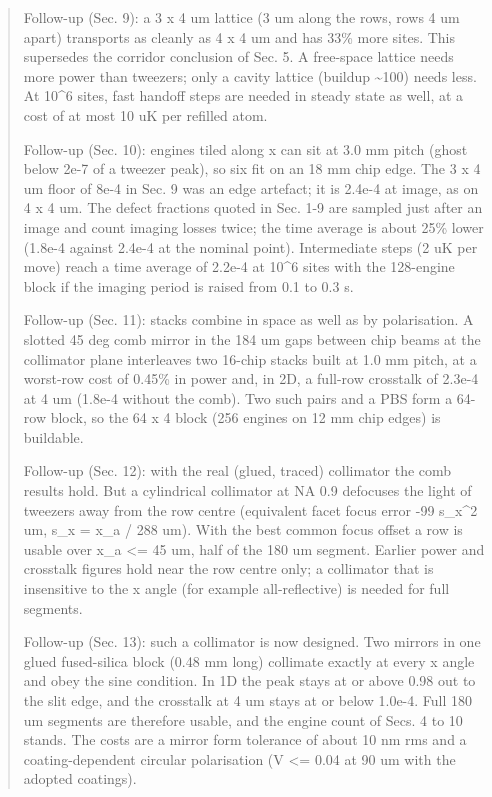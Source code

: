 \begin{quote}
Follow-up (Sec. 9): a 3 x 4 um lattice (3 um along the rows, rows 4 um
apart) transports as cleanly as 4 x 4 um and has 33\% more sites. This
supersedes the corridor conclusion of Sec. 5. A free-space lattice needs
more power than tweezers; only a cavity lattice (buildup
\textasciitilde100) needs less. At 10\^{}6 sites, fast handoff steps are
needed in steady state as well, at a cost of at most 10 uK per refilled
atom.

Follow-up (Sec. 10): engines tiled along x can sit at 3.0 mm pitch
(ghost below 2e-7 of a tweezer peak), so six fit on an 18 mm chip edge.
The 3 x 4 um floor of 8e-4 in Sec. 9 was an edge artefact; it is 2.4e-4
at image, as on 4 x 4 um. The defect fractions quoted in Sec. 1-9 are
sampled just after an image and count imaging losses twice; the time
average is about 25\% lower (1.8e-4 against 2.4e-4 at the nominal
point). Intermediate steps (2 uK per move) reach a time average of
2.2e-4 at 10\^{}6 sites with the 128-engine block if the imaging period
is raised from 0.1 to 0.3 s.

Follow-up (Sec. 11): stacks combine in space as well as by polarisation.
A slotted 45 deg comb mirror in the 184 um gaps between chip beams at
the collimator plane interleaves two 16-chip stacks built at 1.0 mm
pitch, at a worst-row cost of 0.45\% in power and, in 2D, a full-row
crosstalk of 2.3e-4 at 4 um (1.8e-4 without the comb). Two such pairs
and a PBS form a 64-row block, so the 64 x 4 block (256 engines on 12 mm
chip edges) is buildable.

Follow-up (Sec. 12): with the real (glued, traced) collimator the comb
results hold. But a cylindrical collimator at NA 0.9 defocuses the light
of tweezers away from the row centre (equivalent facet focus error -99
s\_x\^{}2 um, s\_x = x\_a / 288 um). With the best common focus offset a
row is usable over \textbar x\_a\textbar{} \textless= 45 um, half of the
180 um segment. Earlier power and crosstalk figures hold near the row
centre only; a collimator that is insensitive to the x angle (for
example all-reflective) is needed for full segments.

Follow-up (Sec. 13): such a collimator is now designed. Two mirrors in
one glued fused-silica block (0.48 mm long) collimate exactly at every x
angle and obey the sine condition. In 1D the peak stays at or above 0.98
out to the slit edge, and the crosstalk at 4 um stays at or below
1.0e-4. Full 180 um segments are therefore usable, and the engine count
of Secs. 4 to 10 stands. The costs are a mirror form tolerance of about
10 nm rms and a coating-dependent circular polarisation
(\textbar V\textbar{} \textless= 0.04 at 90 um with the adopted
coatings).
\end{quote}

